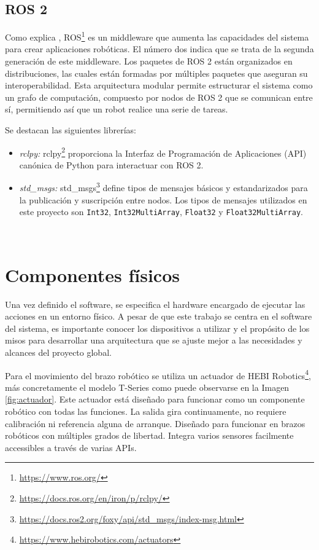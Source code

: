 \subsection{ROS 2}
\label{sec:entornos}

Como explica \cite{perales10a}, ROS\footnote{\url{https://www.ros.org/}} es un middleware que aumenta las capacidades del sistema para crear aplicaciones robóticas. El número dos indica que se trata de la segunda generación de este middleware.
Los paquetes de ROS 2 están organizados en distribuciones, las cuales están formadas por múltiples paquetes que aseguran su interoperabilidad.
Esta arquitectura modular permite estructurar el sistema como un grafo de computación, compuesto por nodos de ROS 2 que se comunican entre sí, permitiendo así que un robot realice una serie de tareas.

Se destacan las siguientes librerías:

\begin{itemize}
    \item \textit{rclpy:} rclpy\footnote{\url{https://docs.ros.org/en/iron/p/rclpy/}} proporciona la Interfaz de Programación de Aplicaciones (API) canónica de Python para interactuar con ROS 2.
    \item \textit{std\_msgs:} std\_msgs\footnote{\url{https://docs.ros2.org/foxy/api/std_msgs/index-msg.html}} define tipos de mensajes básicos y estandarizados para la publicación y suscripción entre nodos. Los tipos de mensajes utilizados en este proyecto son \verb|Int32|, \verb|Int32MultiArray|, \verb|Float32| y \verb|Float32MultiArray|.
\end{itemize}\

\section{Componentes físicos}
\label{sec:entornos}

Una vez definido el software, se especifica el hardware encargado de ejecutar las acciones en un entorno físico.
A pesar de que este trabajo se centra en el software del sistema, es importante conocer los dispositivos a utilizar y el propósito de los misos para desarrollar una arquitectura que se ajuste mejor a las necesidades y alcances del proyecto global.

Para el movimiento del brazo robótico se utiliza un actuador de HEBI Robotics\footnote{\url{https://www.hebirobotics.com/actuators}}, más concretamente el modelo T-Series como puede observarse en la Imagen \ref{fig:actuador}.
Este actuador está diseñado para funcionar como un componente robótico con todas las funciones.
La salida gira continuamente, no requiere calibración ni referencia alguna de arranque.
Diseñado para funcionar en brazos robóticos con múltiples grados de libertad.
Integra varios sensores facilmente accessibles a través de varias APIs.


